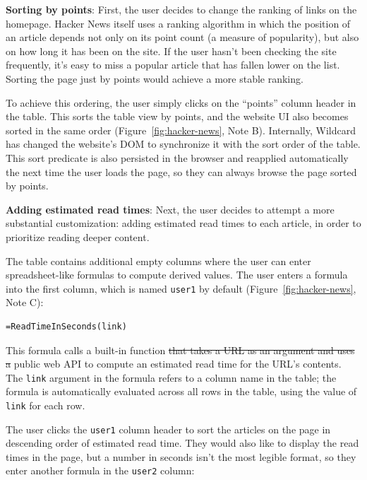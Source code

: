 \documentclass[sigplan,screen,10pt,anonymous,review]{acmart}
\providecommand{\DIFadd}[1]{{\protect\color{blue}\uwave{#1}}} %
\providecommand{\DIFdel}[1]{{\protect\color{red}\sout{#1}}}                      %
\providecommand{\DIFaddbegin}{} %
\providecommand{\DIFaddend}{} %
\providecommand{\DIFdelbegin}{} %
\providecommand{\DIFdelend}{} %
\begin{document}
\textbf{Sorting by points}: First, the user decides to change the
ranking of links on the homepage. Hacker News itself uses a ranking
algorithm in which the position of an article depends not only on its
point count (a measure of popularity), but also on how long it has been
on the site. If the user hasn't been checking the site frequently, it's
easy to miss a popular article that has fallen lower on the list.
Sorting the page just by points would achieve a more stable ranking.

To achieve this ordering, the user simply clicks on the ``points''
column header in the table. This sorts the table view by points, and the
website UI also becomes sorted in the same order
(Figure~\ref{fig:hacker-news}, Note B). Internally, Wildcard has changed
the website's DOM to synchronize it with the sort order of the table.
This sort predicate is also persisted in the browser and reapplied
automatically the next time the user loads the page, so they can always
browse the page sorted by points.

\textbf{Adding estimated read times}: Next, the user decides to attempt
a more substantial customization: adding estimated read times to each
article, in order to prioritize reading deeper content.

The table contains additional empty columns where the user can enter
spreadsheet-like formulas to compute derived values. The user enters a
formula into the first column, which is named \texttt{user1} by default
(Figure~\ref{fig:hacker-news}, Note C):

\begin{verbatim}
=ReadTimeInSeconds(link)
\end{verbatim}

This formula calls a built-in function \DIFdelbegin \DIFdel{that takes a URL as an argument
and uses a }\DIFdelend \DIFaddbegin \texttt{\DIFadd{ReadTimeInSeconds}} \DIFadd{that
uses a third-party }\DIFaddend public web API to compute an estimated read time for
the URL's contents. The \texttt{link} argument in the formula refers to
a column name in the table; the formula is automatically evaluated
across all rows in the table, using the value of \texttt{link} for each
row.

The user clicks the \texttt{user1} column header to sort the articles on
the page in descending order of estimated read time. They would also
like to display the read times in the page, but a number in seconds
isn't the most legible format, so they enter another formula in the
\texttt{user2} column:
\end{document}
